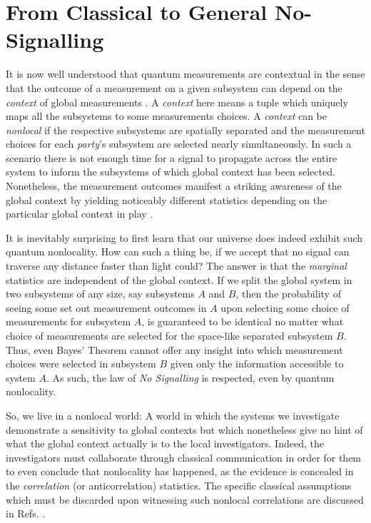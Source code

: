 \documentclass[
  12pt          %
  ,letterpaper  %
  ,center       %
  ,noupper      %
  ,english,fleqn]{uconnthesis}
\let\stdsection\section
\renewcommand\section{\newpage\stdsection}
\begin{document}
\section{From Classical to General No-Signalling}\label{sec:intro}
    It is now well understood that quantum measurements are contextual in the sense that the outcome of a measurement on a given subsystem can depend on the {\em context} of global measurements \cite{SpekkensSeer,Pentagrams,ExperimentalContextuality,ks18,CSWNew}. A {\em context} here means a tuple which uniquely maps all the subsystems to some measurements choices. A {\em context} can be {\em nonlocal} if the respective subsystems are spatially separated and the measurement choices for each {\em party}'s subsystem are selected nearly simultaneously. In such a scenario there is not enough time for a signal to propagate across the entire system to inform the subsystems of which global context has been selected. Nonetheless, the measurement outcomes manifest a striking awareness of the global context by yielding noticeably different statistics depending on the particular global context in play \cite{WernerWolfe2001,GisinFramework2012,BellAndNonContextualInequalities,ContextualityLeggettGarg,ContextualityWithSignalling,QMysteriesAravid,FritzCorrelationScenarios,GriffithsLocality,BellCausalityReview,BellCausalityArXiv,BellAssumptionsWiseman,Brunner2013Bell}.
   
    It is inevitably surprising to first learn that our universe does indeed exhibit such quantum nonlocality. How can such a thing be, if we accept that no signal can traverse any distance faster than light could? The answer is that the {\em marginal} statistics are independent of the global context. If we split the global system in two subsystems of any size, say subsystems $A$ and $B$, then the probability of seeing some set out measurement outcomes in $A$ upon selecting some choice of measurements for subsystem $A$, is guaranteed to be identical no matter what choice of measurements are selected for the space-like separated subsystem $B$. Thus, even Bayes' Theorem cannot offer any insight into which measurement choices were selected in subsystem $B$ given only the information accessible to system $A$. As such, the law of {\em No Signalling} is respected, even by quantum nonlocality. 
   
    So, we live in a nonlocal world: A world in which the systems we investigate demonstrate a sensitivity to global contexts but which nonetheless give no hint of what the global context actually is to the local investigators. Indeed, the investigators must collaborate through classical communication in order for them to even conclude that nonlocality has happened, as the evidence is concealed in the {\em correlation} (or anticorrelation) statistics. The specific classical assumptions which must be discarded upon witnessing such nonlocal correlations are discussed in Refs. \cite{FritzCorrelationScenarios,GriffithsLocality,BellCausalityReview,BellCausalityArXiv,BellAssumptionsWiseman}.
    
\end{document}
